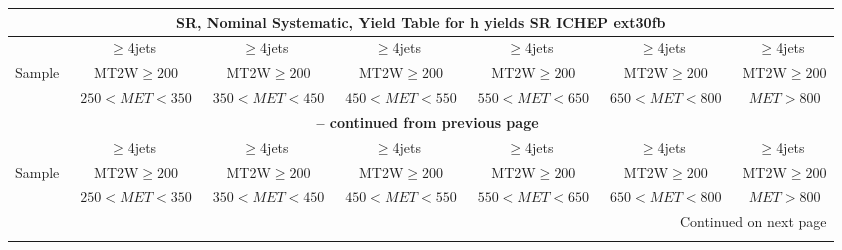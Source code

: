 \documentclass{article}
\begin{document}
\begin{longtable}{|l|c|c|c|c|c|c|} 
 
\multicolumn{7}{c}{ SR, Nominal Systematic, Yield Table for h yields SR ICHEP ext30fb }\\* \hline 
  & $\ge$4jets  & $\ge$4jets  & $\ge$4jets  & $\ge$4jets  & $\ge$4jets  & $\ge$4jets \\* 
Sample  & ~MT2W$\ge200$  & ~MT2W$\ge200$  & ~MT2W$\ge200$  & ~MT2W$\ge200$  & ~MT2W$\ge200$  & ~MT2W$\ge200$ \\* 
  & ~$250<MET<350$  & ~$350<MET<450$  & ~$450<MET<550$  & ~$550<MET<650$  & ~$650<MET<800$  & ~$MET>800$ \\* 
\hline \hline 
\endfirsthead 
 
\multicolumn{7}{c}{{\bfseries \tablename\ \thetable{} -- continued from previous page}}\\* \hline 
  & $\ge$4jets  & $\ge$4jets  & $\ge$4jets  & $\ge$4jets  & $\ge$4jets  & $\ge$4jets \\* 
Sample  & ~MT2W$\ge200$  & ~MT2W$\ge200$  & ~MT2W$\ge200$  & ~MT2W$\ge200$  & ~MT2W$\ge200$  & ~MT2W$\ge200$ \\* 
  & ~$250<MET<350$  & ~$350<MET<450$  & ~$450<MET<550$  & ~$550<MET<650$  & ~$650<MET<800$  & ~$MET>800$ \\* 
\hline \hline 
\endhead 
 
\multicolumn{7}{|r|}{{Continued on next page}}\\* \hline 
\endfoot 
 
 
\endlastfoot 
 

\end{longtable}
\end{document}
